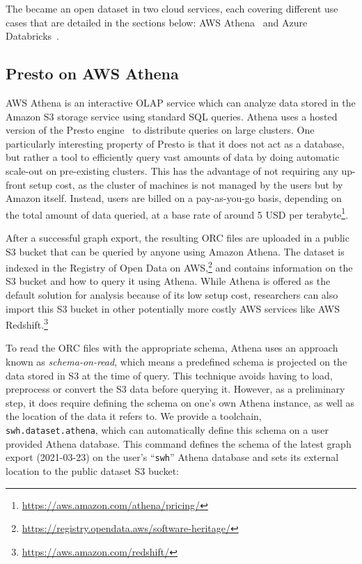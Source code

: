 The \SWHGD{} became an open dataset in two cloud services, each covering
different use cases that are detailed in the sections below: AWS
Athena~\cite{website-amazon-athena} and Azure
Databricks~\cite{website-azure-databricks}.

\subsection{Presto on AWS Athena}

AWS Athena is an interactive OLAP service which can analyze data stored in
the Amazon S3 storage service using standard SQL queries. Athena uses a hosted
version of the Presto engine~\cite{sethi2019presto} to distribute queries on
large clusters.  One particularly interesting property of Presto is that it
does not act as a database, but rather a tool to efficiently query vast amounts
of data by doing automatic scale-out on pre-existing clusters. This has the
advantage of not requiring any up-front setup cost, as the cluster of machines
is not managed by the users but by Amazon itself. Instead, users are billed on
a pay-as-you-go basis, depending on the total amount of data queried, at a base
rate of around 5 USD per
terabyte\footnote{\url{https://aws.amazon.com/athena/pricing/}}.

After a successful graph export, the resulting ORC files are uploaded in a public
S3 bucket that can be queried by anyone using Amazon Athena. The dataset is
indexed in the Registry of Open Data on
AWS,\footnote{\url{https://registry.opendata.aws/software-heritage/}} and
contains information on the S3 bucket and how to query it using Athena. While
Athena is offered as the default solution for analysis because of its low setup
cost, researchers can also import this S3 bucket in other potentially more
costly AWS services like AWS
Redshift.\footnote{\url{https://aws.amazon.com/redshift/}}

To read the ORC files with the appropriate schema, Athena uses an approach
known as \emph{schema-on-read}, which means a predefined schema is projected on
the data stored in S3 at the time of query. This technique avoids having to
load, preprocess or convert the S3 data before querying it. However, as a
preliminary step, it does require defining the schema on one's own Athena
instance, as well as the location of the data it refers to. We provide a
toolchain, \texttt{swh.dataset.athena}, which can automatically define this
schema on a user provided Athena database. This command defines the schema of
the latest graph export (2021-03-23) on the user's ``\texttt{swh}'' Athena
database and sets its external location to the public dataset S3 bucket:

